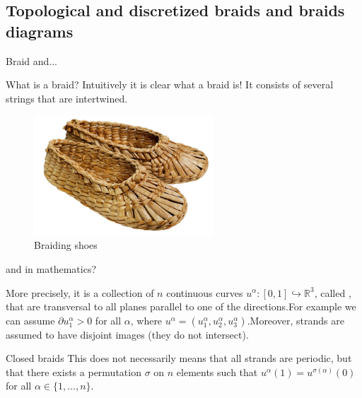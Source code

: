 \documentclass[9pt, english]{beamer}
\theoremstyle{definition}
\newcommand{\R}{\mathbb{R}}                     %
\begin{document}
\subsection{Topological and discretized braids and braids diagrams}
\begin{frame}{Braid and... }
    \begin{block}{What is a braid?}\pause
        Intuitively it is clear what a braid is! It consists of several strings that are
        intertwined.\pause
        \begin{figure}\label{fig:shoes}
        \includegraphics[width=0.6\textwidth]{images/2774braiding_shoe.jpg}\caption{Braiding shoes}
        \end{figure}
\end{block}
\end{frame}
\begin{frame}{and in mathematics?}
    \begin{block}{More precisely,}
        it is a collection of $n$ continuous curves
        $u^\alpha:[0,1] \hookrightarrow \R^3$, called
        , \pause
        that are transversal to all planes parallel to one of the
        directions.\pause  For example we can assume $\partial u_1^\alpha>0$
        for all $\alpha$, where $u^\alpha=(u_1^\alpha, u_2^\alpha,
        u_3^\alpha)$.\pause Moreover, strands are assumed to have disjoint
        images \alert{(they do not intersect)}.
    \end{block}\pause
    \begin{block}{Closed braids}
        This does not necessarily means that all strands are
        periodic,\pause
        but that there exists a permutation $\sigma$ on $n$ elements such
        that $u^\alpha(1)=u^{\sigma(\alpha)}(0)$ for all $\alpha \in
        \{1, \dots,n\}$.
    \end{block}
\end{frame}
\end{document}
